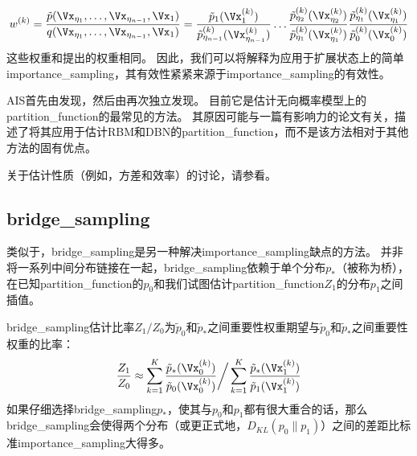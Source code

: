 \begin{equation}
	w^{(k)} = \frac{ \tilde{p}(\Vx_{\eta_1}, \dots, \Vx_{\eta_{n-1}}, \Vx_1) }{ q( \Vx_{\eta_1}, \dots, \Vx_{\eta_{n-1}}, \Vx_1 ) } =
\frac{ \tilde{p}_1(\Vx_1^{(k)}) }{ \tilde{p}_{\eta_{n-1}}^{(k)}(\Vx_{\eta_{n-1}}^{(k)}) } \dots
\frac{ \tilde{p}_{\eta_{2}}^{(k)}(\Vx_{\eta_{2}}^{(k)}) }{ \tilde{p}_{\eta_1}^{(k)}(\Vx_{\eta_{1}}^{(k)}) } 
\frac{ \tilde{p}_{\eta_{1}}^{(k)}(\Vx_{\eta_{1}}^{(k)}) }{ \tilde{p}_{0}^{(k)}(\Vx_{0}^{(k)}) }
\end{equation}
这些权重和提出的权重相同。
因此，我们可以将解释为应用于扩展状态上的简单\gls{importance_sampling}，其有效性紧紧来源于\gls{importance_sampling}的有效性。


\gls{AIS}首先由\cite{Jarzynski1997}发现，然后由\cite{Neal-2001}再次独立发现。
目前它是估计无向概率模型上的\gls{partition_function}的最常见的方法。
其原因可能与一篇有影响力的论文\citep{Salakhutdinov+Murray-2008}有关，描述了将其应用于估计\gls{RBM}和\gls{DBN}的\gls{partition_function}，而不是该方法相对于其他方法的固有优点。


关于估计性质（例如，方差和效率）的讨论，请参看\cite{Neal-2001}。


\subsection{\gls{bridge_sampling}}
\label{subsec:bridge_sampling}
类似于，\gls{bridge_sampling}\citep{Bennet76}是另一种解决\gls{importance_sampling}缺点的方法。
并非将一系列中间分布链接在一起，\gls{bridge_sampling}依赖于单个分布$p_*$（被称为桥），在已知\gls{partition_function}的$p_0$和我们试图估计\gls{partition_function}$Z_1$的分布$p_1$之间插值。


\gls{bridge_sampling}估计比率$Z_1 / Z_0$为$\tilde{p}_0$和$\tilde{p}_*$之间重要性权重期望与$\tilde{p}_0$和$\tilde{p}_*$之间重要性权重的比率：
\begin{equation}
	\frac{Z_1}{ Z_0} \approx \sum_{k=1}^K \frac{ \tilde{p}_*(\Vx_0^{(k)}) }{ \tilde{p}_0(\Vx_0^{(k)}) } \bigg/ \sum_{k=1}^K \frac{ \tilde{p}_*(\Vx_1^{(k)}) }{ \tilde{p}_1(\Vx_1^{(k)}) }
\end{equation}
如果仔细选择\gls{bridge_sampling}$p_*$，使其与$p_0$和$p_1$都有很大重合的话，那么\gls{bridge_sampling}会使得两个分布（或更正式地，$D_{KL}(p_0 \| p_1)$）之间的差距比标准\gls{importance_sampling}大得多。


